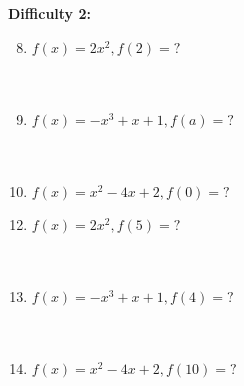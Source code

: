 \documentclass{article}
\begin{document}
\vspace{4cm}
\noindent
\textbf{Difficulty 2:}
\\
\begin{minipage}[t]{0.45\textwidth}
    \begin{enumerate}
        \setcounter{enumi}{7}
        \item $f(x)=2x^2, f(2)=?$
        \\\\\\
        \item $f(x)=-x^3 + x + 1, f(a)=?$
        \\\\\\
        \item $f(x)=x^2 - 4x + 2, f(0)=?$
    \end{enumerate}
\end{minipage}%
\hfill
\begin{minipage}[t]{0.45\textwidth}
    \begin{enumerate}
        \setcounter{enumi}{11} %
        \item $f(x)=2x^2, f(5)=?$
        \\\\\\
        \item $f(x)=-x^3 + x + 1, f(4)=?$
        \\\\\\
        \item $f(x)=x^2 - 4x + 2, f(10)=?$

    \end{enumerate}
\end{minipage}
\end{document}
